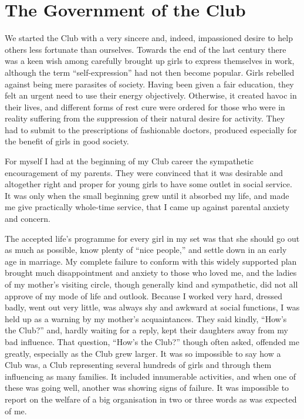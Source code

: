 \chapter{The Government of the Club}

We started the Club with a very sincere and, indeed,
impassioned desire to help others less fortunate than ourselves.
Towards the end of the last century there was a
keen wish among carefully brought up girls to express
themselves in work, although the term “self-express\-ion”
had not then become popular. Girls rebelled against
being mere parasites of society. Having been given a fair
education, they felt an urgent need to use their energy
objectively. Otherwise, it created havoc in their lives,
and different forms of rest cure were ordered for those
who were in reality suffering from the suppression of
their natural desire for activity. They had to submit to
the prescriptions of fashionable doctors, produced especially
for the benefit of girls in good society.

For myself I had at the beginning of my Club career
the sympathetic encouragement of my parents. They
were convinced that it was desirable and altogether right
and proper for young girls to have some outlet in social
service. It was only when the small beginning grew
until it absorbed my life, and made me give practically
whole-time service, that I came up against parental
anxiety and concern.

The accepted life’s programme for every girl in my set
was that she should go out as much as possible, know
plenty of “nice people,” and settle down in an early age
in marriage. My complete failure to conform with this
widely supported plan brought much disappointment and
anxiety to those who loved me, and the ladies of my
mother’s visiting circle, though generally kind and sympathetic,
did not all approve of my mode of life and outlook.
Because I worked very hard, dressed badly, went
out very little, was always shy and awkward at social
functions, I was held up as a warning by my mother’s
acquaintances. They said kindly, “How’s the Club?”
and, hardly waiting for a reply, kept their daughters
away from my bad influence. That question, “How’s
the Club?” though often asked, offended me greatly,
especially as the Club grew larger. It was so impossible
to say how a Club was, a Club representing several
hundreds of girls and through them influencing as many
families. It included innumerable activities, and when
one of these was going well, another was showing signs of
failure. It was impossible to report on the welfare of a
big organisation in two or three words as was expected
of me.

